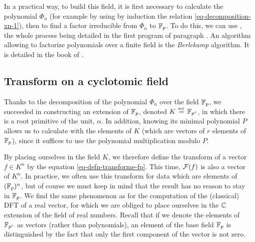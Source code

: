  
 
In a practical way, to build this field, it is first necessary to calculate the polynomial $ \Phi_n $ (for example by using by induction the relation \eqref{eq-decomposition-xn-1}), then to find a factor irreducible from $ \Phi_n $ to $ \mathbb{F}_p $. To do this, we can use \Maple{}, the whole process being detailed in the first program of paragraph . An algorithm allowing to factorize polynomials over a finite field is the \textit{Berlekamp} algorithm. It is detailed in the book of  \cite{demazure}.  


\subsection{Transform on a cyclotomic field}
\label{sect2-trans-cyclotomic-field}
 
 
Thanks to the decomposition of the polynomial $ \Phi_n $ over the field $ \mathbb{F}_p $, we succeeded in constructing an extension of $ \mathbb{F}_p $, denoted $ K \stackrel{\mbox{\upshape\tiny def.}}{=} \mathbb{F}_{p^r} $, in which there is a root  primitive of the unit, $ \alpha $. In addition, knowing its minimal polynomial $ P $ allows us to calculate with the elements of $ K $ (which are vectors of $ r $ elements of $ \mathbb{F}_p $), since it suffices to use the polynomial multiplication modulo $ P $.
 
 
By placing ourselves in the field $ K $, we therefore define the transform of a vector $ f \in K^n $ by the equation \eqref{eq-defn-transforme-fp}. This time, $ \mathcal{F}(f) $ is also a vector of $ K^n $. In practice, we often use this transform for data which are elements of $ (\mathbb{F}_p)^n $, but of course we must keep in mind that the result has no reason to stay in $ \mathbb{F}_p $. We find the same phenomenon as for the computation of the (classical) DFT of a real vector, for which we are obliged to place ourselves in the $ \mathbb{C} $ extension of the field of real numbers. Recall that if we denote the elements of $ \mathbb{F}_{p^r} $ as vectors (rather than polynomials), an element of the base field $ \mathbb{F}_p $ is distinguished by the fact that only the first component of the vector is not zero.
 
